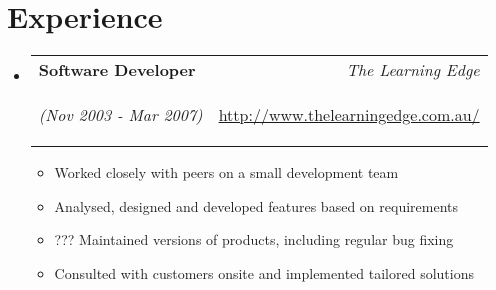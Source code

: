 \documentclass[11pt, letterpaper]{article}
\makeatletter
\newenvironment{filltable}
{
	\begin{tabular*}{6in}{l@{\extracolsep{\fill}}r}
	}{
	\end{tabular*}
}
\newcommand{\experience}[5]
{
	\begin{filltable}
		\textbf{#2} & \textit{#1}\\
		\textit{(#3 - #4)} & #5\\
	\end{filltable}
}
\newcommand{\aexperience}[5]
{
	\begin{itemize} 
		\item \experience{#1}{#2}{#3}{#4}{#5}
	\end{itemize}
}
\newenvironment{lexperience}[5]
{
	\begin{itemize}
	 \item \experience{#1}{#2}{#3}{#4}{#5}
		\begin{itemize}
}{
		\end{itemize}
	\end{itemize}
}
\makeatother
\begin{document}
\section*{Experience}

\begin{lexperience}{The Learning Edge}{Software Developer}{Nov 2003}{Mar 2007}
{\begin{small}\url{http://www.thelearningedge.com.au/} \end{small}}
	\item Worked closely with peers on a small development team
	\item Analysed, designed and developed features based on requirements
	\item ??? Maintained versions of products, including regular bug fixing
	\item Consulted with customers onsite and implemented tailored solutions
\end{lexperience}

\begin{comment}
	\aexperience{Dick Smith Electronics}{Salesperson}{2000}{2003}{}
	\item Serving and providing assistance wherever possible to customers in relation to electronic merchandise and accessories
	\item Ensuring that the store is neat and tidy, displays are eye-catching and that the pricing tickets are up-to-date
	\item Managing stock that is received into the store on a daily basis
\end{comment}
\end{document}
